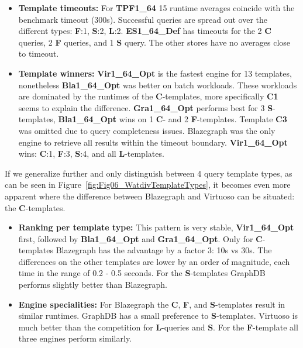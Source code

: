 \begin{itemize}
	\item \textbf{Template timeouts:} For \textbf{TPF1\_64} 15 runtime averages coincide with the benchmark timeout (300s). Successful queries are spread out over the different types: \textbf{F}:1, \textbf{S}:2, \textbf{L}:2.
	\textbf{ES1\_64\_Def} has timeouts for the 2 \textbf{C} queries,  2 \textbf{F} queries, and 1 \textbf{S} query. The other stores have no averages close to timeout.
	
	\item  \textbf{Template winners:} \textbf{Vir1\_64\_Opt} is the fastest engine for 13 templates, nonetheless \textbf{Bla1\_64\_Opt} was better on batch workloads. These workloads are dominated by the runtimes of the \textbf{C}-templates, more specifically \textbf{C1} seems to explain the difference. 
	\textbf{Gra1\_64\_Opt} performs best for 3 \textbf{S}-templates, \textbf{Bla1\_64\_Opt} wins on 1 \textbf{C}- and 2 \textbf{F}-templates. Template \textbf{C3} was omitted due to query completeness issues. Blazegraph was the only engine to retrieve all results within the timeout boundary.
	\textbf{Vir1\_64\_Opt} wins: \textbf{C}:1, \textbf{F}:3, \textbf{S}:4, and all \textbf{L}-templates.
\end{itemize}

If we generalize further and only distinguish between 4 query template types, as can be seen in Figure~\ref{fig:Fig06_WatdivTemplateTypes}, it becomes even more apparent where the difference between Blazegraph and Virtuoso can be situated: the \textbf{C}-templates.
\begin{itemize}
	\item \textbf{Ranking per template type:} This pattern is very stable, \textbf{Vir1\_64\_Opt} first, followed by \textbf{Bla1\_64\_Opt} and \textbf{Gra1\_64\_Opt}. Only for \textbf{C}-templates Blazegraph has the advantage  by a factor 3: 10s vs 30s. The differences on the other templates are lower by an order of magnitude, each time in the range of 0.2 - 0.5 seconds. For the \textbf{S}-templates GraphDB performs slightly better than Blazegraph.
	\item \textbf{Engine specialities:} For Blazegraph the \textbf{C}, \textbf{F}, and \textbf{S}-templates result in similar runtimes. GraphDB has a small preference to \textbf{S}-templates. Virtuoso is much better than the competition for \textbf{L}-queries and \textbf{S}. For the \textbf{F}-template all three engines perform similarly.
\end{itemize}